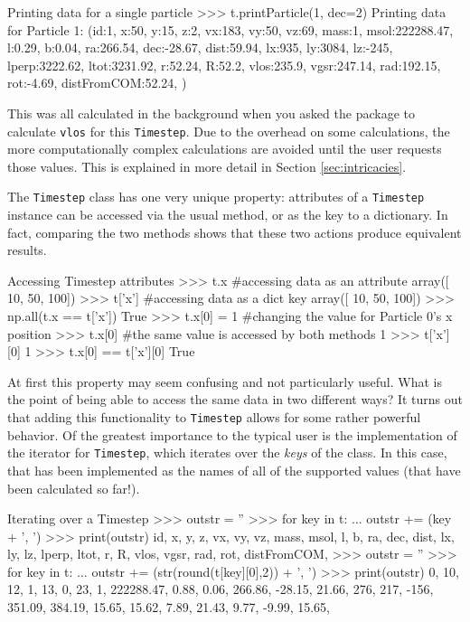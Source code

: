 \documentclass{article}
\begin{document}
\begin{codelisting}{Printing data for a single particle}
>>> t.printParticle(1, dec=2)
Printing data for Particle 1:
(id:1, x:50, y:15, z:2, vx:183, vy:50, vz:69, mass:1, msol:222288.47, 
l:0.29, b:0.04, ra:266.54, dec:-28.67, dist:59.94, lx:935, ly:3084, 
lz:-245, lperp:3222.62, ltot:3231.92, r:52.24, R:52.2, vlos:235.9, 
vgsr:247.14, rad:192.15, rot:-4.69, distFromCOM:52.24, )
\end{codelisting}

This was all calculated in the background when you asked the package to calculate \verb!vlos! for this \verb!Timestep!. Due to the overhead on some calculations, the more computationally complex calculations are avoided until the user requests those values. This is explained in more detail in Section \ref{sec:intricacies}. 

The \verb!Timestep! class has one very unique property: attributes of a \verb!Timestep! instance can be accessed via the usual method, or as the key to a dictionary. In fact, comparing the two methods shows that these two actions produce equivalent results. \\

\begin{codelisting}{Accessing Timestep attributes}
>>> t.x #accessing data as an attribute
array([ 10,  50, 100])
>>> t['x'] #accessing data as a dict key
array([ 10,  50, 100])
>>> np.all(t.x == t['x'])
True
>>> t.x[0] = 1 #changing the value for Particle 0's x position
>>> t.x[0] #the same value is accessed by both methods
1
>>> t['x'][0]
1
>>> t.x[0] == t['x'][0]
True
\end{codelisting}

At first this property may seem confusing and not particularly useful. What is the point of being able to access the same data in two different ways? It turns out that adding this functionality to \verb!Timestep! allows for some rather powerful behavior. Of the greatest importance to the typical user is the implementation of the iterator for \verb!Timestep!, which iterates over the \textit{keys} of the class. In this case, that has been implemented as the names of all of the supported values (that have been calculated so far!).\\

\begin{codelisting}{Iterating over a Timestep}
>>> outstr = ''
>>> for key in t:
...     outstr += (key + ', ')
>>> print(outstr)
id, x, y, z, vx, vy, vz, mass, msol, l, b, ra, dec, dist, lx, ly, 
lz, lperp, ltot, r, R, vlos, vgsr, rad, rot, distFromCOM, 
>>> outstr = ''
>>> for key in t:
...	outstr += (str(round(t[key][0],2)) + ', ')
>>> print(outstr)
0, 10, 12, 1, 13, 0, 23, 1, 222288.47, 0.88, 0.06, 266.86, -28.15, 21.66, 
276, 217, -156, 351.09, 384.19, 15.65, 15.62, 7.89, 21.43, 9.77, -9.99,
15.65,
\end{codelisting}
\end{document}

